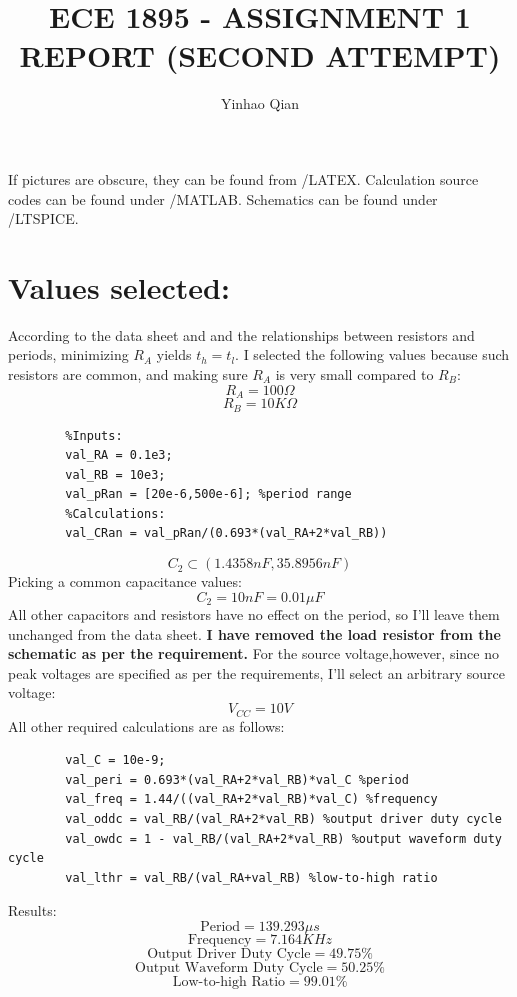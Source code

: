 \documentclass{article}
\title{ECE 1895 - ASSIGNMENT 1 REPORT (SECOND ATTEMPT)}
\author{Yinhao Qian}
\begin{document}
	\maketitle
	If pictures are obscure, they can be found from /LATEX. 
	Calculation source codes can be found under /MATLAB.
	Schematics can be found under /LTSPICE.
	\section*{Values selected:}
	According to the data sheet and and the relationships between resistors and periods, minimizing $R_A$ yields $t_h=t_l$. I selected the following values because such resistors are common, and making sure $R_A$ is very small compared to $R_B$:
	\[R_A=100\Omega\]
	\[R_B=10K\Omega\]
	\begin{verbatim}
		%Inputs:
		val_RA = 0.1e3;
		val_RB = 10e3;
		val_pRan = [20e-6,500e-6]; %period range
		%Calculations:
		val_CRan = val_pRan/(0.693*(val_RA+2*val_RB))
	\end{verbatim}
	\[C_2\subset(1.4358nF,35.8956nF)\]
	Picking a common capacitance values:
	\[C_2=10nF=0.01\mu F\]
	All other capacitors and resistors have no effect on the period, so I'll leave them unchanged from the data sheet. \textbf{I have removed the load resistor from the schematic as per the requirement.} For the source voltage,however, since no peak voltages are specified as per the requirements, I'll select an arbitrary source voltage:
	\[V_{CC}=10V\]
	All other required calculations are as follows:
	\begin{verbatim}
		val_C = 10e-9;
		val_peri = 0.693*(val_RA+2*val_RB)*val_C %period
		val_freq = 1.44/((val_RA+2*val_RB)*val_C) %frequency
		val_oddc = val_RB/(val_RA+2*val_RB) %output driver duty cycle
		val_owdc = 1 - val_RB/(val_RA+2*val_RB) %output waveform duty cycle
		val_lthr = val_RB/(val_RA+val_RB) %low-to-high ratio
	\end{verbatim}
	Results:
	\[\mbox{Period}=139.293\mu s\]
	\[\mbox{Frequency}=7.164KHz\]
	\[\mbox{Output Driver Duty Cycle}=49.75\%\]
	\[\mbox{Output Waveform Duty Cycle}=50.25\%\]
	\[\mbox{Low-to-high Ratio}=99.01\%\]
\end{document}
